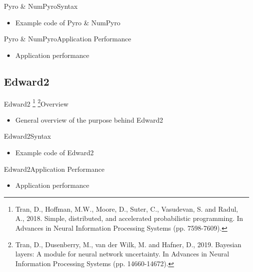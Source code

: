 \documentclass[AERbeamer%
              ,optEnglish%
              ,optBiber%
              ,optBibstyleAlphabetic%
              ,optBeamerClassicFormat%
              ]{AERlatex}%
\begin{document}
\begin{frame}[c]{Pyro \& NumPyro}{Syntax}
    \centering
    \begin{itemize}
        \item Example code of Pyro \& NumPyro
    \end{itemize}
\end{frame}


\begin{frame}[c]{Pyro \& NumPyro}{Application Performance}
    \centering
    \begin{itemize}
        \item Application performance
    \end{itemize}
\end{frame}


\subsection{Edward2}
\begin{frame}[c]{Edward2 \footnote{Tran, D., Hoffman, M.W., Moore, D., Suter, C., Vasudevan, S. and Radul, A., 2018. Simple, distributed,
                                   and accelerated probabilistic programming. In Advances in Neural Information Processing Systems (pp. 7598-7609).}
                         \footnote{Tran, D., Dusenberry, M., van der Wilk, M. and Hafner, D., 2019. Bayesian layers: A module for neural network
                                   uncertainty. In Advances in Neural Information Processing Systems (pp. 14660-14672).}}{Overview}
    \centering
    \begin{itemize}
        \item General overview of the purpose behind Edward2
    \end{itemize}
\end{frame}


\begin{frame}[c]{Edward2}{Syntax}
    \centering
    \begin{itemize}
        \item Example code of Edward2
    \end{itemize}
\end{frame}


\begin{frame}[c]{Edward2}{Application Performance}
    \centering
    \begin{itemize}
        \item Application performance
    \end{itemize}
\end{frame}
\end{document}
